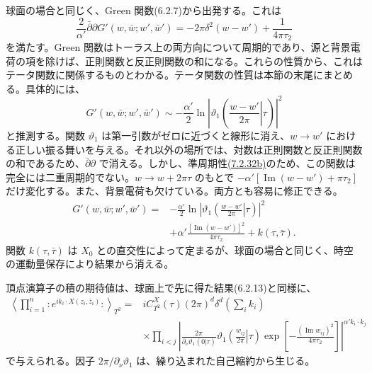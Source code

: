 
球面の場合と同じく、Green 関数(6.2.7)から出発する。これは
\begin{equation}
\frac{2}{\alpha'}\bar\partial\partial
G'(w,\bar w;w',\bar w')
=-2\pi\delta^2(w-w')+\frac{1}{4\pi\tau_2}
\tag{7.2.1}\label{eq:7.2.1}
\end{equation}
を満たす。Green 関数はトーラス上の両方向について周期的であり、源と背景電荷の項を除けば、正則関数と反正則関数の和になる。これらの性質から、これはテータ関数に関係するものとわかる。テータ関数の性質は本節の末尾にまとめる。具体的には、
\begin{equation}
G'(w,\bar w;w',\bar w')
\sim-\frac{\alpha'}{2}
\ln\left|\vartheta_1\left(\left.\frac{w-w'}{2\pi}\right|\tau\right)\right|^2
\tag{7.2.2}\label{eq:7.2.2}
\end{equation}
と推測する。関数 $\vartheta_1$ は第一引数がゼロに近づくと線形に消え、$w\to w'$ における正しい振る舞いを与える。それ以外の場所では、対数は正則関数と反正則関数の和であるため、$\bar\partial\partial$ で消える。しかし、準周期性\hyperref[eq:7.2.32b]{(7.2.32b)}のため、この関数は完全には二重周期的でない。$w\to w+2\pi\tau$ のもとで $-\alpha'[\operatorname{Im}(w-w')+\pi\tau_2]$ だけ変化する。また、背景電荷も欠けている。両方とも容易に修正できる。
\begin{equation}
\begin{aligned}
G'(w,\bar w;w',\bar w')
={}&-\frac{\alpha'}{2}
\ln\left|\vartheta_1\left(\left.\frac{w-w'}{2\pi}\right|\tau\right)\right|^2\\
&+\alpha'\frac{[\operatorname{Im}(w-w')]^2}{4\pi\tau_2}
+k(\tau,\bar\tau).
\end{aligned}
\tag{7.2.3}\label{eq:7.2.3}
\end{equation}
関数 $k(\tau,\bar\tau)$ は $X_0$ との直交性によって定まるが、球面の場合と同じく、時空の運動量保存により結果から消える。

頂点演算子の積の期待値は、球面上で先に得た結果(6.2.13)と同様に、
\begin{equation}
\begin{aligned}
\left\langle\prod_{i=1}^{n}
{:}e^{ik_i\cdot X(z_i,\bar z_i)}{:}\right\rangle_{T^2}
={}&iC_{T^2}^{X}(\tau)(2\pi)^d\delta^d\left(\sum_i k_i\right)\\
&\times\prod_{i<j}\left|
\frac{2\pi}{\partial_\nu\vartheta_1(0|\tau)}
\vartheta_1\left(\left.\frac{w_{ij}}{2\pi}\right|\tau\right)
\exp\left[-\frac{(\operatorname{Im}w_{ij})^2}{4\pi\tau_2}\right]
\right|^{\alpha'k_i\cdot k_j}
\end{aligned}
\tag{7.2.4}\label{eq:7.2.4}
\end{equation}
で与えられる。因子 $2\pi/\partial_\nu\vartheta_1$ は、繰り込まれた自己縮約から生じる。


